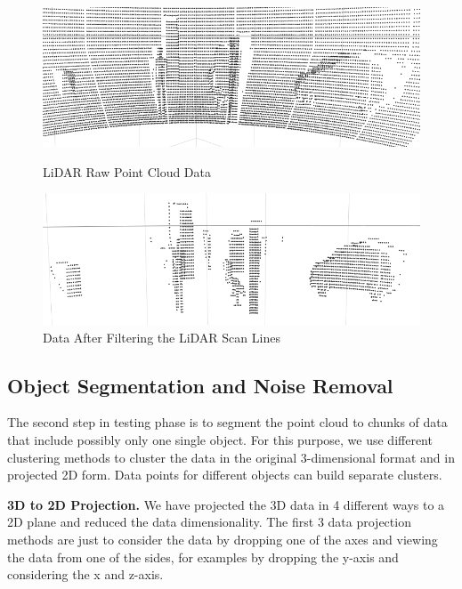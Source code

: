 \begin{figure}[!h]
\centering
\begin{minipage}{0.49\textwidth}
  \centering
        \includegraphics[width=.9\linewidth]{images/ground_before2.png}
        \caption{LiDAR Raw Point Cloud Data}
        \label{fig:ground_before}
\end{minipage}%
\begin{minipage}{0.49\textwidth}
  \centering
        \includegraphics[width=.9\linewidth]{images/ground_after2.png}
        \caption{Data After Filtering the LiDAR Scan Lines}
        \label{fig:after}
\end{minipage}%
\end{figure}
%
%
\subsection{Object Segmentation and Noise Removal}
The %
second
step in testing phase is to segment the point cloud to chunks of data that include
possibly only one single object. For this purpose, we use different clustering
methods to cluster the data in the original 3-dimensional format and in projected 2D form.
Data points for different objects can build separate clusters.


\textbf{3D to 2D Projection.}
We have projected the 3D data in 4 different ways to a 2D plane and reduced the data dimensionality.
The first 3 data projection methods are just to consider the data by dropping one of the axes and
viewing the data from one of the sides, for examples by dropping the y-axis and considering the x
and z-axis.

